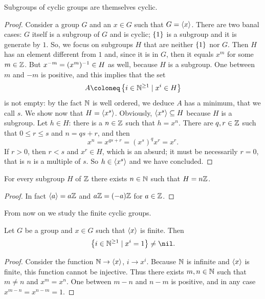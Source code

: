 \begin{proposition}\label{prop:SubgroupsOfCyclicGroupsAreCyclic}
Subgroups of cyclic groups are themselves cyclic.
\end{proposition}

\begin{proof}
Consider a group \(G\) and an \(x \in G\) such that \(G = \left\langle x\right\rangle\). There are two banal cases: \(G\) itself is a subgroup of \(G\) and is cyclic; \(\left\{1\right\}\) is a subgroup and it is generate by \(1\). So, we focus on subgroups \(H\) that are neither \(\left\{1\right\}\) nor \(G\). Then \(H\) has an element different from \(1\) and, since it is in \(G\), then it equals \(x^m\) for some \(m \in \mathbb Z\). But \(x^{-m} = (x^m)^{-1} \in H\) as well, because \(H\) is a subgroup. One between \(m\) and \(-m\) is positive, and this implies that the set
\[A \coloneq \set{i \in \nn^{\ge 1} \mid x^i \in H}\]
is not empty: by the fact \(\mathbb N\) is well ordered, we deduce \(A\) has a minimum, that we call \(s\). We show now that \(H = \left\langle x^s\right\rangle\). Obviously, \(\left\langle x^s\right\rangle \subseteq H\) because \(H\) is a subgroup. Let \(h \in H\): there is a \(n \in \mathbb Z\) such that \(h = x^n\). There are \(q, r \in \mathbb Z\) such that \(0 \le r \le s\) and \(n =qs +r\), and then
\[x^n = x^{qs+r} = (x^s)^q x^r = x^r .\]
If \(r > 0\), then \(r < s\) and \(x^r \in H\), which is an absurd; it must be necessarily \(r = 0\), that is \(n\) is a multiple of \(s\). So \(h \in \left\langle x^s\right\rangle\) and we have concluded.
\end{proof}

\begin{corollary}\label{cor:SubgroupsOfZ}
For every subgroup \(H\) of \(\mathbb Z\) there exists \(n \in \mathbb N\) such that \(H = n\mathbb Z\).
\end{corollary}

\begin{proof}
In fact \(\left\langle a\right\rangle = a\mathbb Z\) and \(a \mathbb Z = (-a)\mathbb Z\) for \(a \in \mathbb Z\).
\end{proof}

From now on we study the finite cyclic groups.

\begin{lemma}Let \(G\) be a group and \(x \in G\) such that \(\left\langle x\right\rangle\) is finite. Then
\[\set{i \in \nn^{\ge 1} \mid x^i = 1} \ne \nil.\]
\end{lemma}

\begin{proof}
Consider the function \(\mathbb N \to \left\langle x\right\rangle\), \(i \to x^i\). Because \(\mathbb N\) is infinite and \(\left\langle x\right\rangle\) is finite, this function cannot be injective. Thus there exists \(m, n \in \mathbb N\) such that \(m \ne n\) and \(x^m = x^n\). One between \(m-n\) and \(n-m\) is positive, and in any case \(x^{m-n} = x^{n-m} = 1\). 
\end{proof}

